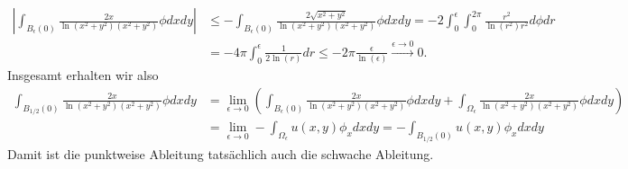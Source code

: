 \begin{solution}
\begin{align*}
  \left|\int_{B_\epsilon(0)}\frac{2x}{\ln(x^2+y^2)(x^2+y^2)}\phi dxdy\right|
  &\leq -\int_{B_\epsilon(0)}\frac{2\sqrt{x^2 +y^2}}{\ln(x^2+y^2)(x^2+y^2)}\phi dxdy
  = -2\int_0^\epsilon\int_0^{2\pi}\frac{r^2}{\ln(r^2)r^2} d\phi dr \\
  &= -4\pi\int_0^\epsilon \frac{1}{2\ln(r)} dr \leq -2\pi \frac{\epsilon}{\ln(\epsilon)}
  \xrightarrow{\epsilon \to 0} 0.
\end{align*}
Insgesamt erhalten wir also
\begin{align*}
\int_{B_{1/2}(0)}\frac{2x}{\ln(x^2+y^2)(x^2+y^2)}\phi dxdy &=
\lim_{\epsilon \to 0}\left(\int_{B_\epsilon(0)}\frac{2x}{\ln(x^2+y^2)(x^2+y^2)}\phi dxdy
+ \int_{\Omega_\epsilon}\frac{2x}{\ln(x^2+y^2)(x^2+y^2)}\phi dxdy\right) \\
&= \lim_{\epsilon \to 0}- \int_{\Omega_\epsilon}u(x,y)\phi_x dxdy
= -\int_{B_{1/2}(0)}u(x,y)\phi_x dxdy
\end{align*}
Damit ist die punktweise Ableitung tatsächlich auch die schwache Ableitung.
\end{solution}

